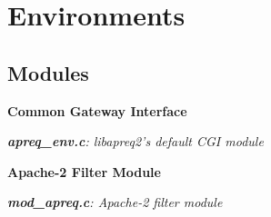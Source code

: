 \section{Environments}
\label{group__MODULES}
\subsection*{Modules}
\begin{CompactItemize}
\item 
{\bf Common Gateway Interface}
\begin{CompactList}\small\item\em {\bf apreq\_\-env.c}: libapreq2's default CGI module\item\end{CompactList}

\item 
{\bf Apache-2 Filter Module}
\begin{CompactList}\small\item\em {\bf mod\_\-apreq.c}: Apache-2 filter module\item\end{CompactList}

\end{CompactItemize}
